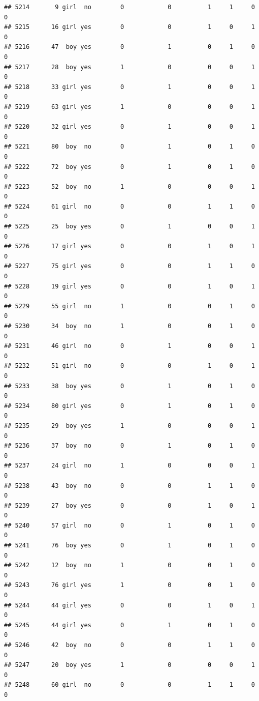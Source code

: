 \documentclass[man]{apa6}
\begin{document}
\begin{verbatim}
## 5214       9 girl  no        0            0          1     1     0     0
## 5215      16 girl yes        0            0          1     0     1     0
## 5216      47  boy yes        0            1          0     1     0     0
## 5217      28  boy yes        1            0          0     0     1     0
## 5218      33 girl yes        0            1          0     0     1     0
## 5219      63 girl yes        1            0          0     0     1     0
## 5220      32 girl yes        0            1          0     0     1     0
## 5221      80  boy  no        0            1          0     1     0     0
## 5222      72  boy yes        0            1          0     1     0     0
## 5223      52  boy  no        1            0          0     0     1     0
## 5224      61 girl  no        0            0          1     1     0     0
## 5225      25  boy yes        0            1          0     0     1     0
## 5226      17 girl yes        0            0          1     0     1     0
## 5227      75 girl yes        0            0          1     1     0     0
## 5228      19 girl yes        0            0          1     0     1     0
## 5229      55 girl  no        1            0          0     1     0     0
## 5230      34  boy  no        1            0          0     1     0     0
## 5231      46 girl  no        0            1          0     0     1     0
## 5232      51 girl  no        0            0          1     0     1     0
## 5233      38  boy yes        0            1          0     1     0     0
## 5234      80 girl yes        0            1          0     1     0     0
## 5235      29  boy yes        1            0          0     0     1     0
## 5236      37  boy  no        0            1          0     1     0     0
## 5237      24 girl  no        1            0          0     0     1     0
## 5238      43  boy  no        0            0          1     1     0     0
## 5239      27  boy yes        0            0          1     0     1     0
## 5240      57 girl  no        0            1          0     1     0     0
## 5241      76  boy yes        0            1          0     1     0     0
## 5242      12  boy  no        1            0          0     1     0     0
## 5243      76 girl yes        1            0          0     1     0     0
## 5244      44 girl yes        0            0          1     0     1     0
## 5245      44 girl yes        0            1          0     1     0     0
## 5246      42  boy  no        0            0          1     1     0     0
## 5247      20  boy yes        1            0          0     0     1     0
## 5248      60 girl  no        0            0          1     1     0     0

\end{verbatim}
\end{document}
